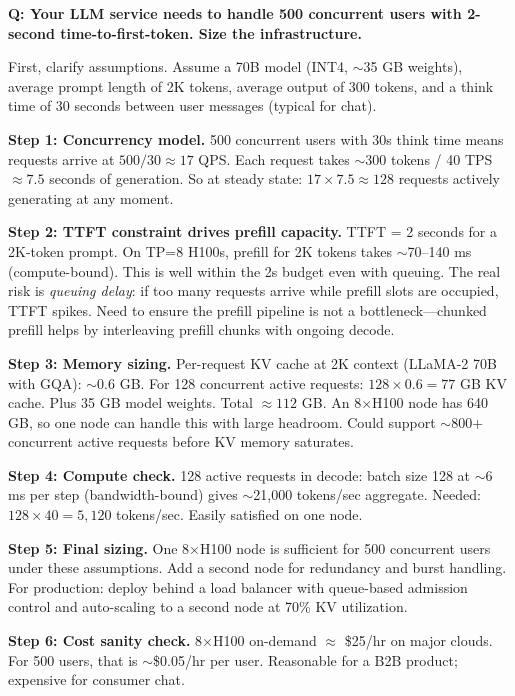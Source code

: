 \begin{interviewq}
\textbf{Q: Your LLM service needs to handle 500 concurrent users with 2-second time-to-first-token. Size the infrastructure.}

 \quad {} \quad \badgefreq{\freqlow}

\stronganswer

First, clarify assumptions. Assume a 70B model (INT4, $\sim$35 GB weights), average prompt length of 2K tokens, average output of 300 tokens, and a think time of 30 seconds between user messages (typical for chat).

\textbf{Step 1: Concurrency model.} 500 concurrent users with 30s think time means requests arrive at $500 / 30 \approx 17$ QPS. Each request takes $\sim$300 tokens / 40 TPS $\approx 7.5$ seconds of generation. So at steady state: $17 \times 7.5 \approx 128$ requests actively generating at any moment.

\textbf{Step 2: TTFT constraint drives prefill capacity.} TTFT = 2 seconds for a 2K-token prompt. On TP=8 H100s, prefill for 2K tokens takes $\sim$70--140 ms (compute-bound). This is well within the 2s budget even with queuing. The real risk is \textit{queuing delay}: if too many requests arrive while prefill slots are occupied, TTFT spikes. Need to ensure the prefill pipeline is not a bottleneck---chunked prefill helps by interleaving prefill chunks with ongoing decode.

\textbf{Step 3: Memory sizing.} Per-request KV cache at 2K context (LLaMA-2 70B with GQA): $\sim$0.6 GB. For 128 concurrent active requests: $128 \times 0.6 = 77$ GB KV cache. Plus 35 GB model weights. Total $\approx 112$ GB. An 8$\times$H100 node has 640 GB, so one node can handle this with large headroom. Could support $\sim$800+ concurrent active requests before KV memory saturates.

\textbf{Step 4: Compute check.} 128 active requests in decode: batch size 128 at $\sim$6 ms per step (bandwidth-bound) gives $\sim$21{,}000 tokens/sec aggregate. Needed: $128 \times 40 = 5{,}120$ tokens/sec. Easily satisfied on one node.

\textbf{Step 5: Final sizing.} One 8$\times$H100 node is sufficient for 500 concurrent users under these assumptions. Add a second node for redundancy and burst handling. For production: deploy behind a load balancer with queue-based admission control and auto-scaling to a second node at 70\% KV utilization.

\textbf{Step 6: Cost sanity check.} 8$\times$H100 on-demand $\approx$ \$25/hr on major clouds. For 500 users, that is $\sim$\$0.05/hr per user. Reasonable for a B2B product; expensive for consumer chat.


\end{interviewq}
